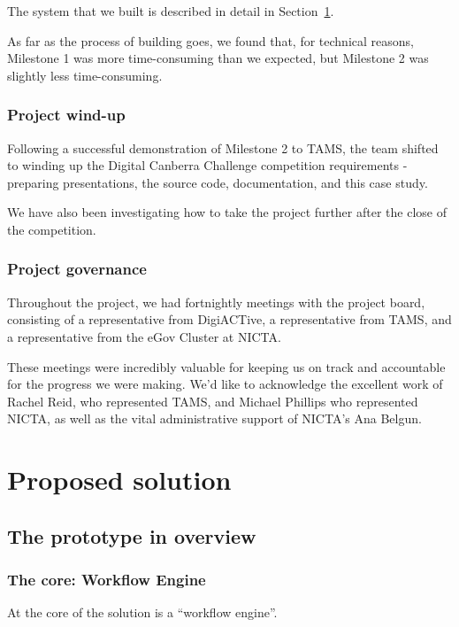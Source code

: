 \documentclass[12pt,a4paper,twosided]{article}
\begin{document}
The system that we built is described in detail in Section~\ref{sec:solution}. 

As far as the
process of building goes, we found that, for technical reasons,
Milestone 1 was more time-consuming than we expected, but Milestone 2
was slightly less time-consuming.

\subsubsection{Project wind-up}

Following a successful demonstration of Milestone 2 to TAMS, the team
shifted to winding up the Digital Canberra Challenge competition
requirements - preparing presentations, the source code, documentation,
and this case study.

We have also been investigating how to take the project further after
the close of the competition.

\subsubsection{Project governance}

Throughout the project, we had fortnightly meetings with the project
board, consisting of a representative from DigiACTive, a representative
from TAMS, and a representative from the eGov Cluster at NICTA.

These meetings were incredibly valuable for keeping us on track and
accountable for the progress we were making. We'd like to acknowledge
the excellent work of Rachel Reid, who represented TAMS, and Michael
Phillips who represented NICTA, as well as the vital administrative
support of NICTA's Ana Belgun.

\newpage
\section{Proposed solution}
\label{sec:solution}
\subsection{The prototype in overview}

\subsubsection{The core: Workflow Engine}

At the core of the solution is a ``workflow engine''.
\end{document}

